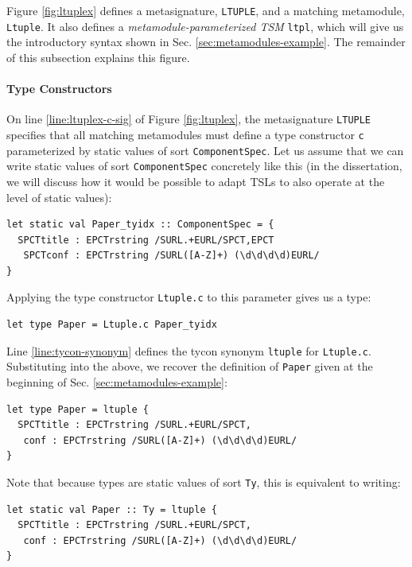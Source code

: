 Figure \ref{fig:ltuplex} defines a metasignature, \lstinline{LTUPLE}, and a matching 
metamodule, \lstinline{Ltuple}. It also defines a \emph{metamodule-parameterized TSM} \lstinline{ltpl}, which will give us the introductory syntax shown in Sec. \ref{sec:metamodules-example}. The remainder of this subsection explains this figure.

\paragraph{Type Constructors} On line \ref{line:ltuplex-c-sig} of Figure \ref{fig:ltuplex}, the metasignature \lstinline{LTUPLE} specifies that all matching metamodules must define a type constructor \lstinline{c} parameterized by {static values} of {sort} \lstinline{ComponentSpec}. %
Let us assume that we can write static values of sort \lstinline{ComponentSpec} concretely like this (in the dissertation, we will discuss how it would be possible to adapt TSLs to also operate at the level of static values):
\begin{lstlisting}[numbers=none]
let static val Paper_tyidx :: ComponentSpec = {
  SPCTtitle : EPCTrstring /SURL.+EURL/SPCT,EPCT
   SPCTconf : EPCTrstring /SURL([A-Z]+) (\d\d\d\d)EURL/
}
\end{lstlisting}
Applying the type constructor \lstinline{Ltuple.c} to this parameter gives us a type:
\begin{lstlisting}[numbers=none]
let type Paper = Ltuple.c Paper_tyidx
\end{lstlisting}
Line \ref{line:tycon-synonym} defines the tycon synonym \lstinline{ltuple} for \lstinline{Ltuple.c}. Substituting into the above, we recover the definition of \lstinline{Paper} given at the beginning of Sec. \ref{sec:metamodules-example}:
\begin{lstlisting}[numbers=none]
let type Paper = ltuple {
  SPCTtitle : EPCTrstring /SURL.+EURL/SPCT,
   conf : EPCTrstring /SURL([A-Z]+) (\d\d\d\d)EURL/
}
\end{lstlisting}
Note that because types are static values of sort \lstinline{Ty}, this is equivalent to writing:
\begin{lstlisting}[numbers=none]
let static val Paper :: Ty = ltuple {
  SPCTtitle : EPCTrstring /SURL.+EURL/SPCT,
   conf : EPCTrstring /SURL([A-Z]+) (\d\d\d\d)EURL/
}
\end{lstlisting}

